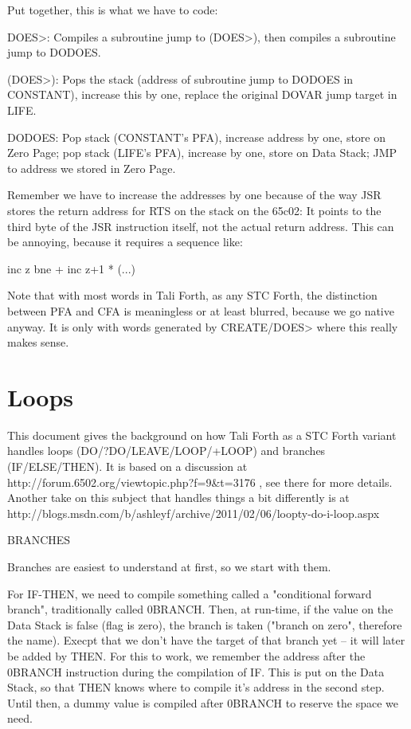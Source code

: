 Put together, this is what we have to code: 

DOES>: Compiles a subroutine jump to (DOES>), then compiles a subroutine jump
to DODOES.

(DOES>): Pops the stack (address of subroutine jump to DODOES in CONSTANT),
increase this by one, replace the original DOVAR jump target in LIFE. 

DODOES: Pop stack (CONSTANT's PFA), increase address by one, store on Zero
Page; pop stack (LIFE's PFA), increase by one, store on Data Stack; JMP to
address we stored in Zero Page. 


Remember we have to increase the addresses by one because of the way JSR stores
the return address for RTS on the stack on the 65c02: It points to the third
byte of the JSR instruction itself, not the actual return address. This can be
annoying, because it requires a sequence like:

        inc z
        bne +
        inc z+1 
*       (...) 

Note that with most words in Tali Forth, as any STC Forth, the distinction
between PFA and CFA is meaningless or at least blurred, because we go native
anyway. It is only with words generated by CREATE/DOES> where this really makes
sense.

\section{Loops}



This document gives the background on how Tali Forth as a STC Forth variant
handles loops (DO/?DO/LEAVE/LOOP/+LOOP) and branches (IF/ELSE/THEN). It is
based on a discussion at http://forum.6502.org/viewtopic.php?f=9&t=3176 , see
there for more details. Another take on this subject that handles things a bit
differently is at
http://blogs.msdn.com/b/ashleyf/archive/2011/02/06/loopty-do-i-loop.aspx


BRANCHES

Branches are easiest to understand at first, so we start with them. 

For IF-THEN, we need to compile something called a "conditional forward
branch", traditionally called 0BRANCH. Then, at run-time, if the value on the
Data Stack is false (flag is zero), the branch is taken ("branch on zero",
therefore the name). Execpt that we don't have the target of that branch yet --
it will later be added by THEN. For this to work, we remember the address after
the 0BRANCH instruction during the compilation of IF. This is put on the Data
Stack, so that THEN knows where to compile it's address in the second step.
Until then, a dummy value is compiled after 0BRANCH to reserve the space we
need. 

